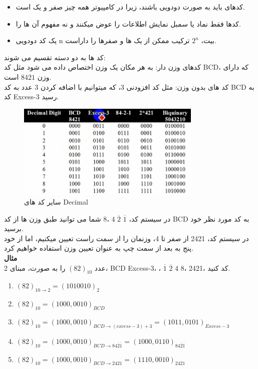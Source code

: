 \documentclass[pt, a5paper]{article}
\begin{document}
\begin{itemize}\raggedleft
	\item
کدهای باید به صورت دودویی باشند، زیرا در کامپیوتر همه چیز صفر و یک است.
	\item
کدها فقط نماد یا سمبل نمایش اطلاعات را عوض میکنند و نه مفهوم آن ها را.
	\item
یک کد دودویی n بیت،
$2^{n}$
ترکیب ممکن از یک ها و صفرها را داراست.
\end{itemize}


کد ها به دو دسته تقسیم می شوند:\\
کدهای وزن دار: به هر مکان یک وزن اختصاص داده می شود مثل کد BCD، که دارای وزن
$8 4 2 1$
است.\\
کد های بدون وزن: مثل کد افزودنی 3، که میتوانیم با اضافه کردن 3 عدد به کد BCD به کد Excess-3 رسید.\\
\begin{figure}[htbp]
	\centerline{\includegraphics[width=250pt]{img/codes.jpg}}
	\caption{سایر کد های Decimal}
	\label{fig}
\end{figure}

در سیستم کد،
$\overline{1}$
$\overline{2}$
$4$
،$8$
شما می توانید طبق وزن ها از کد BCD به کد مورد نظر خود برسید.\\

در سیستم کد، 2421
از صفر تا 4، وزنمان را از سمت راست تعیین میکنیم، اما از خود پنج به بعد از سمت چپ به عنوان تعیین وزن استفاده خواهیم کرد.\\

\textbf{مثال}\\
عدد
$(82)_{10}$
را به صورت، مبنای 2،
BCD
Excess-3،
،
$\overline{1}$
$\overline{2}$
$4$
$8$،
2421، 
کد کنید.\\

\begin{enumerate}\raggedright
	\item
	$(82)_{10\rightarrow2} = (1010010)_{2}$
	\item
	$(82)_{10} = (1000,0010)_{BCD}$
	\item
	$(82)_{10} = (1000,0010)_{BCD\rightarrow (excess-3)+3} = (1011,0101)_{Excess-3}$
	\item
	$(82)_{10} = (1000,0010)_{BCD \rightarrow 84\overline{2}\overline{1}} = (1000,0110)_{84\overline{2}\overline{1}}$
	\item
	$(82)_{10} = (1000,0010)_{BCD \rightarrow 2421} = (1110,0010)_{2421}$
\end{enumerate}
\end{document}

